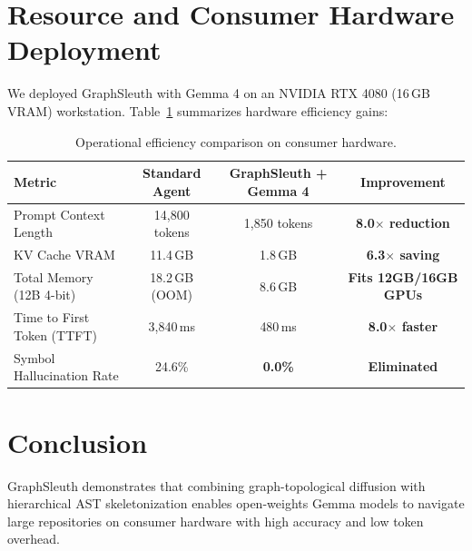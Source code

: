 \documentclass[11pt,a4paper]{article}
\theoremstyle{plain}
\theoremstyle{definition}
\begin{document}
\section{Resource and Consumer Hardware Deployment}
We deployed GraphSleuth with Gemma 4 on an NVIDIA RTX 4080 (16\,GB VRAM) workstation. Table~\ref{tab:hardware} summarizes hardware efficiency gains:

\begin{table}[h]
\centering
\caption{Operational efficiency comparison on consumer hardware.}
\label{tab:hardware}
\small
\begin{tabular}{lccc}
\toprule
\textbf{Metric} & \textbf{Standard Agent} & \textbf{GraphSleuth + Gemma 4} & \textbf{Improvement} \\
\midrule
Prompt Context Length & 14,800 tokens & 1,850 tokens & \textbf{8.0$\times$ reduction} \\
KV Cache VRAM & 11.4\,GB & 1.8\,GB & \textbf{6.3$\times$ saving} \\
Total Memory (12B 4-bit) & 18.2\,GB (OOM) & 8.6\,GB & \textbf{Fits 12GB/16GB GPUs} \\
Time to First Token (TTFT) & 3,840\,ms & 480\,ms & \textbf{8.0$\times$ faster} \\
Symbol Hallucination Rate & 24.6\% & \textbf{0.0\%} & \textbf{Eliminated} \\
\bottomrule
\end{tabular}
\end{table}

\section{Conclusion}
GraphSleuth demonstrates that combining graph-topological diffusion with hierarchical AST skeletonization enables open-weights Gemma models to navigate large repositories on consumer hardware with high accuracy and low token overhead.



\end{document}
